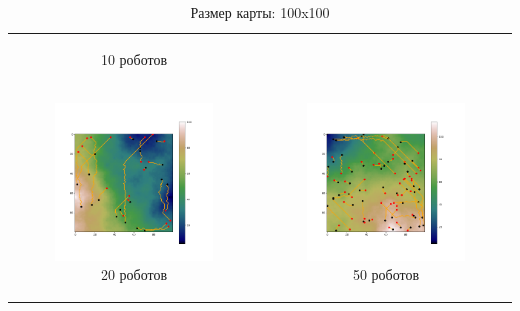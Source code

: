 \documentclass{article}
\begin{document}
\begin{table}[H]
\begin{tabular}{c c}
\begin{subfigure}{0.5\linewidth}
			\caption*{10 роботов}
			\end{subfigure}
			\\
            \begin{subfigure}{0.5\linewidth}
				\includegraphics[width = 1.0\columnwidth]{data/mean_paths/100x100/20.png}
			\caption*{20 роботов}
			\end{subfigure}
			&
			\begin{subfigure}{0.5\linewidth}
				\includegraphics[width = 1.0\columnwidth]{data/mean_paths/100x100/50.png}
			\caption*{50 роботов}
			\end{subfigure}
        \end{tabular}
        \caption*{Размер карты: 100x100}
	\end{table}
\end{document}
